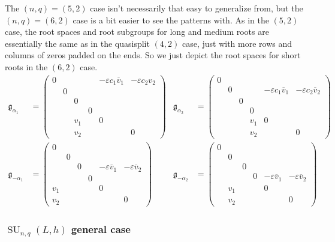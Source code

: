 \documentclass[12pt]{article}
\theoremstyle{definition}
\numberwithin{theorem}{subsection}
\newcommand{\eps}{\varepsilon}
\newcommand{\ov}{\overline}
\newcommand{\frakg}{\mathfrak{g}}
\DeclareMathOperator{\SU}{SU}
\begin{document}
The $(n,q) = (5,2)$ case isn't necessarily that easy to generalize from, but the $(n,q) = (6,2)$ case is a bit easier to see the patterns with. As in the $(5,2)$ case, the root spaces and root subgroups for long and medium roots are essentially the same as in the quasisplit $(4,2)$ case, just with more rows and columns of zeros padded on the ends. So we just depict the root spaces for short roots in the $(6,2)$ case.
\begin{align*}
	\frakg_{\alpha_1} &=
	\begin{pmatrix}
		0 &&&& -\eps c_1 \ov v_1 & - \eps c_2 v_2 \\
		& 0  \\
		&& 0  \\
		&&& 0  \\
		&& v_1 && 0 \\
		&& v_2 &&& 0
	\end{pmatrix} &
	\frakg_{\alpha_2} &=
	\begin{pmatrix}
		0 \\
		& 0 &&& - \eps c_1 \ov v_1 & - \eps c_2 \ov v_2 \\
		&& 0  \\
		&&& 0  \\
		&&& v_1 & 0 \\
		&&& v_2 && 0 
	\end{pmatrix} \\
	\frakg_{-\alpha_1} &=
	\begin{pmatrix}
		0  \\
		& 0  \\
		&& 0 && - \eps \ov v_1 & - \eps \ov v_2  \\
		&&& 0  \\
		v_1 &&&& 0 \\
		v_2 &&&&& 0
	\end{pmatrix} &
	\frakg_{-\alpha_2} &=
	\begin{pmatrix}
		0  \\
		& 0  \\
		&& 0   \\
		&&& 0 &  - \eps \ov v_1 & - \eps \ov v_2 \\
		& v_1 &&& 0 \\
		& v_2 &&&& 0
	\end{pmatrix}
\end{align*}

\subsubsection{$\SU_{n,q}(L,h)$ general case}
\end{document}
